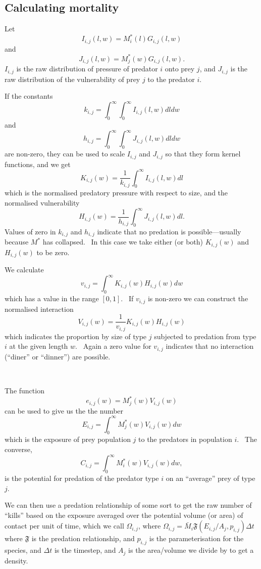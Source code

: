 \subsection{Calculating mortality}

Let
\[ I_{i,j} (l, w) = M^{\ast}_i (l) G_{i,j} (l, w) \]
and
\[ J_{i,j} (l, w) = M^{\ast}_j (w) G_{i,j} (l, w) . \]
$I_{i,j}$ is the raw distribution of pressure of predator $i$ onto prey $j$,
and $J_{i,j}$ is the raw distribution of the vulnerability of prey $j$ to the
predator $i$.

If the constants
\[ k_{i,j} = \int_0^{\infty} \int_0^{\infty} I_{i,j} (l, w) dl dw \]
and
\[ h_{i,j} = \int_0^{\infty} \int_0^{\infty} J_{i,j} (l, w) dl dw \]
are non-zero, they can be used to scale $I_{i,j}$ and $J_{i,j}$ so that they
form kernel functions, and we get
\[ K_{i,j} (w) = \frac{1}{k_{i,j}} \int_0^{\infty} I_{i,j} (l, w) dl \]
which is the normalised predatory pressure with respect to size, and the
normalised vulnerability
\[ H_{i,j} (w) = \frac{1}{h_{i,j}} \int_0^{\infty} J_{i,j} (l, w) dl . \]
Values of zero in $k_{i,j}$ and $h_{i,j}$ indicate that no predation is
possible---usually because $M^{\ast}$ has collapsed. \ In this case we take
either (or both) $K_{i,j} (w)$ and $H_{i,j} (w)$ to be zero.

We calculate
\[ v_{i,j} = \int_0^{\infty} K_{i,j} (w) H_{i,j} (w) dw \]
which has a value in the range $[0, 1]$. \ If $v_{i,j}$ is non-zero we can
construct the normalised interaction
\[ V_{i,j} (w) = \frac{1}{v_{i,j}} K_{i,j} (w) H_{i,j} (w) \]
which indicates the proportion by size of type $j$ subjected to predation from
type $i$ at the given length $w$. \ Again a zero value for $v_{i,j}$ indicates
that no interaction (``diner'' or ``dinner'') are possible.

\

The function
\[ e_{i,j} (w) = M^{\ast}_j (w) V_{i,j} (w)  \]
can be used to give us the the number
\[ E_{i,j} = \int_0^{\infty} M^{\ast}_j (w) V_{i,j} (w) d w \]
which is the exposure of prey population $j$ to the predators in
population $i$. \ The converse,
\[ C_{i,j} = \int_0^{\infty} M_i^{\ast} (w) V_{i,j} (w) d w, \]
is the potential for predation of the predator type $i$ on an ``average'' prey
of type $j$.

We can then use a predation relationship of some sort to get the raw
number of ``kills'' based on the exposure averaged over the potential
volume (or area) of contact per unit of time, which we call $\Omega_{i,j}$, where $\Omega_{i,j} = \bar{M}_i \mathfrak{F} (E_{i,j} / A_j,
p_{i,j}) \Delta t$ where $\mathfrak{F}$ is the predation relationship,
and $p_{i,j}$ is the parameterisation for the species, and $\Delta t$
is the timestep, and $A_j$ is the area/volume we divide by to get a
density. \

